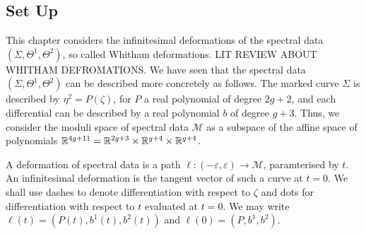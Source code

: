 %
%





\subsection{Set Up}
This chapter considers the infinitesimal deformations of the spectral data $(Σ,Θ^1,Θ^2)$, so called Whitham deformations. LIT REVIEW ABOUT WHITHAM DEFROMATIONS\todo{}. We have seen that the spectral data $(Σ,Θ^1,Θ^2)$ can be described more concretely as follows. The marked curve $Σ$ is described by $η^2 = P(ζ)$, for $P$ a real polynomial of degree $2g+2$, and each differential can be described by a real polynomial $b$ of degree $g+3$. Thus, we consider the moduli space of spectral data $\mathcal{M}$ as a subspace of the affine space of polynomials $\mathbb{R}^{4g+11} = \mathbb{R}^{2g+3}\times\mathbb{R}^{g+4}\times\mathbb{R}^{g+4}$.

A deformation of spectral data is a path $\ell:(-ε,ε) \to \mathcal{M}$, paramterised by $t$. An infinitesimal deformation is the tangent vector of such a curve at $t=0$. We shall use dashes to denote differentiation with respect to $\zeta$ and dots for differentiation with respect to $t$ evaluated at $t=0$. We may write $\ell(t) = (P(t),b^1(t),b^2(t))$ and $\ell(0) = (P,b^1,b^2)$.

